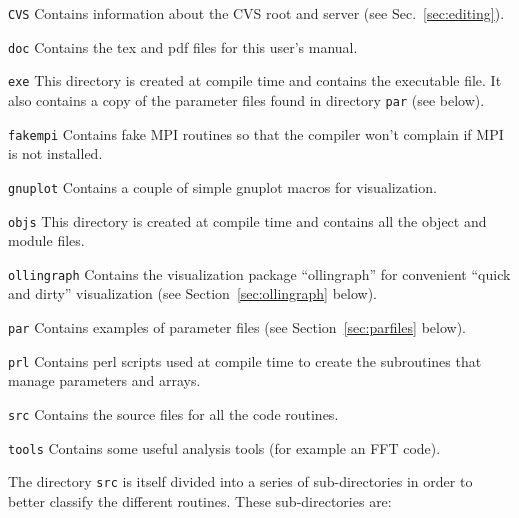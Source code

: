 \documentclass[12pt]{article}
\begin{document}
\begin{list}{}{
\setlength{\leftmargin}{40mm}
\setlength{\labelsep}{10mm}
\setlength{\labelwidth}{25mm}}

\item[\texttt{CVS}] Contains information about the CVS root and server (see
Sec.~\ref{sec:editing}).

\item[\texttt{doc}] Contains the tex and pdf files for this user's
  manual.

\item[\texttt{exe}] This directory is created at compile time and
  contains the executable file.  It also contains a copy of the
  parameter files found in directory \texttt{par} (see below).

\item[\texttt{fakempi}] Contains fake MPI routines so that the
  compiler won't complain if MPI is not installed.

\item[\texttt{gnuplot}] Contains a couple of simple gnuplot macros for
  visualization.

\item[\texttt{objs}] This directory is created at compile time and
  contains all the object and module files.

\item[\texttt{ollingraph}] Contains the visualization package
  ``ollingraph'' for convenient ``quick and dirty'' visualization (see
  Section~\ref{sec:ollingraph} below).

\item[\texttt{par}] Contains examples of parameter files (see
Section~\ref{sec:parfiles} below).

\item[\texttt{prl}] Contains perl scripts used at compile time to create the
subroutines that manage parameters and arrays.

\item[\texttt{src}] Contains the source files for all the code routines.

\item[\texttt{tools}] Contains some useful analysis tools (for example an FFT code).

\end{list}

\vspace{3mm}

The directory \texttt{src} is itself divided into a series of
sub-directories in order to better classify the different
routines. These sub-directories are:
\end{document}
